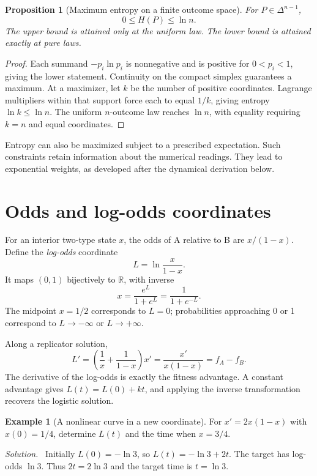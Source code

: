 \documentclass[11pt,oneside,openany]{book}
\newtheorem{proposition}[theorem]{Proposition}
\theoremstyle{definition}
\newtheorem{example}{Example}[chapter]
\theoremstyle{remark}
\newenvironment{solution}{\par\smallskip\noindent\textit{Solution.}\ }{\par\smallskip}
\newcommand{\R}{\mathbb{R}}
\numberwithin{equation}{chapter}
\begin{document}
\begin{proposition}[Maximum entropy on a finite outcome space]
For $P\in\Delta^{n-1}$,
\[
0\leq H(P)\leq\ln n.
\]
The upper bound is attained only at the uniform law. The lower bound is attained exactly at pure laws.
\end{proposition}
\begin{proof}
Each summand $-p_i\ln p_i$ is nonnegative and is positive for $0<p_i<1$, giving the lower statement. Continuity on the compact simplex guarantees a maximum. At a maximizer, let $k$ be the number of positive coordinates. Lagrange multipliers within that support force each to equal $1/k$, giving entropy $\ln k\leq\ln n$. The uniform $n$-outcome law reaches $\ln n$, with equality requiring $k=n$ and equal coordinates.
\end{proof}

Entropy can also be maximized subject to a prescribed expectation. Such constraints retain information about the numerical readings. They lead to exponential weights, as developed after the dynamical derivation below.

\section{Odds and log-odds coordinates}
For an interior two-type state $x$, the odds of A relative to B are $x/(1-x)$. Define the \emph{log-odds} coordinate
\[
L=\ln\frac{x}{1-x}.
\]
It maps $(0,1)$ bijectively to $\R$, with inverse
\[
x=\frac{e^L}{1+e^L}=\frac1{1+e^{-L}}.
\]
The midpoint $x=1/2$ corresponds to $L=0$; probabilities approaching 0 or 1 correspond to $L\to-\infty$ or $L\to+\infty$.

Along a replicator solution,
\begin{equation}\label{eq:logoddsevolution}
L'=\left(\frac1x+\frac1{1-x}\right)x'
=\frac{x'}{x(1-x)}=f_A-f_B.
\end{equation}
The derivative of the log-odds is exactly the fitness advantage. A constant advantage gives $L(t)=L(0)+kt$, and applying the inverse transformation recovers the logistic solution.

\begin{example}[A nonlinear curve in a new coordinate]
For $x'=2x(1-x)$ with $x(0)=1/4$, determine $L(t)$ and the time when $x=3/4$.
\begin{solution}
Initially $L(0)=-\ln3$, so $L(t)=-\ln3+2t$. The target has log-odds $\ln3$. Thus $2t=2\ln3$ and the target time is $t=\ln3$.
\end{solution}
\end{example}
\end{document}
